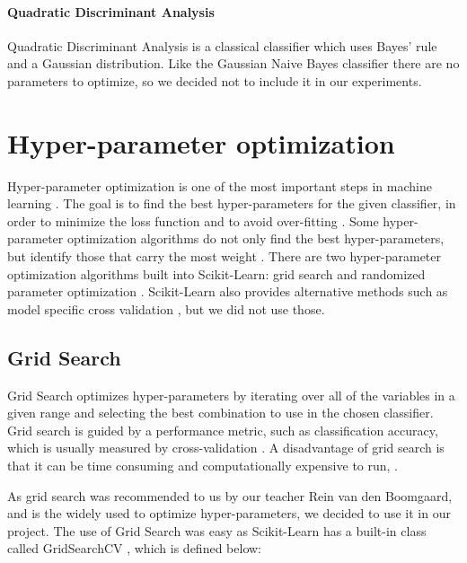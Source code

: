 \documentclass{article}
\begin{document}
	\paragraph{Quadratic Discriminant Analysis}
		Quadratic Discriminant Analysis is a classical classifier which uses Bayes' rule and a Gaussian distribution. Like the Gaussian Naive Bayes classifier there are no parameters to optimize, so we decided not to include it in our experiments.




\section{Hyper-parameter optimization}

	Hyper-parameter optimization is one of the most important steps in machine learning \cite{bardenet}. The goal is to find the best hyper-parameters for the given classifier, in order to minimize the loss function and to avoid over-fitting \cite{Bergstra}. Some hyper-parameter optimization algorithms do not only find the best hyper-parameters, but identify those that carry the most weight \cite{Bergstra}.
	There are two hyper-parameter optimization algorithms built into Scikit-Learn: grid search and randomized parameter optimization \cite{gridsearch}. Scikit-Learn also provides alternative methods such as model specific cross validation  \cite{hyper-parameteroptimizationWiki}, but we did not use those.  
	
	\subsection{Grid Search}
	
		Grid Search optimizes hyper-parameters by iterating over all of the variables in a given range and selecting the best combination to use in the chosen classifier. Grid search is guided by a performance metric, such as classification accuracy, which is usually measured by cross-validation \cite{hyper-parameteroptimizationWiki}. A disadvantage of grid search is that it can be time consuming and computationally expensive to run, \cite{hyper-parameteroptimizationWiki}.

		As grid search was recommended to us by our teacher Rein van den Boomgaard, and is the widely used to optimize hyper-parameters, we decided to use it in our project.
The use of Grid Search was easy as Scikit-Learn has a built-in class called GridSearchCV \cite{gridsearch}, which is defined below:
		
\end{document}
